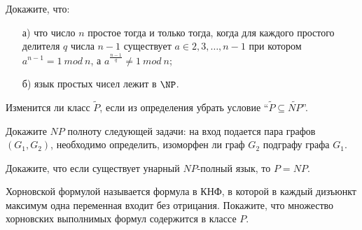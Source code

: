 \setcounter{curtask}{29}


\begin{task}
    Докажите, что:
   	\begin{enumerate}[topsep = 0pt, itemsep = -1ex]
        \item [а)] что число $n$ простое тогда и только тогда, когда для каждого простого делителя $q$ числа $n - 1$ существует $a
            \in {2, 3, \dots, n - 1}$ при котором $a^{n - 1} = 1~mod~n$, а $a^{\frac{n - 1}{q}} \ne 1~mod~n$;
        \item [б)] язык простых чисел лежит в $\NP$.
	\end{enumerate}
\end{task}


\begin{task}
    Изменится ли класс $\widetilde{P}$, если из определения убрать условие
    ``$\widetilde{P} \subseteq \widetilde{NP}$''.
\end{task}

\begin{task}
    Докажите $NP$ полноту следующей задачи:
    на вход подается пара графов $(G_1, G_2)$, необходимо определить, изоморфен ли
    граф $G_2$ подграфу графа $G_1$.
\end{task}

\begin{task}
	Докажите, что если существует унарный $NP$-полный язык, то $P = NP$.
\end{task}

\breakline

\begin{ptask}{26}
    Хорновской формулой называется формула в КНФ, в которой в каждый дизъюнкт
    максимум одна переменная входит без отрицания. Покажите, что множество
    хорновских выполнимых формул содержится в классе $P$.
\end{ptask}